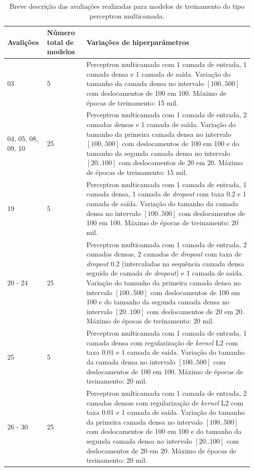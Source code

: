 \begin{table}[ht!]
  \begin{center}
  \setlength{\belowcaptionskip}{10pt}
  \footnotesize {
    \begin{tabular}{|p{1.5cm}|p{2cm}|p{12cm}|}
	  \hline
	  \textbf{Avalições} & \textbf{Número total de modelos} & \textbf{Variações de hiperparâmetros} \\
	  \hline
    03 & 5 & Perceptron multicamada com 1 camada de entrada, 1 camada densa e 1 camada de saída. Variação do tamanho da camada densa no intervalo $[100 .. 500]$ com deslocamentos de 100 em 100. Máximo de épocas de treinamento: 15 mil.\\
    \hline
    04, 05, 08, 09, 10 & 25 & Perceptron multicamada com 1 camada de entrada, 2 camadas densas e 1 camada de saída. Variação do tamanho da primeira camada densa no intervalo $[100 .. 500]$ com deslocamentos de 100 em 100 e do tamanho da segunda camada densa no intervalo $[20 .. 100]$ com deslocamentos de 20 em 20. Máximo de épocas de treinamento: 15 mil. \\
    \hline
    19 & 5 & Perceptron multicamada com 1 camada de entrada, 1 camada densa, 1 camada de \textit{dropout} com taxa 0.2 e 1 camada de saída. Variação do tamanho da camada densa no intervalo $[100 .. 500]$ com deslocamentos de 100 em 100. Máximo de épocas de treinamento: 20 mil. \\
    \hline
    20 - 24 & 25 & Perceptron multicamada com 1 camada de entrada, 2 camadas densas, 2 camadas de \textit{dropout} com taxa de \textit{dropout} 0.2 (intercaladas na sequência camada densa seguida de camada de \textit{dropout}) e 1 camada de saída. Variação do tamanho da primeira camada densa no intervalo $[100 .. 500]$ com deslocamentos de 100 em 100 e do tamanho da segunda camada densa no intervalo $[20 .. 100]$ com deslocamentos de 20 em 20. Máximo de épocas de treinamento: 20 mil. \\
    \hline
    25 & 5 & Perceptron multicamada com 1 camada de entrada, 1 camada densa com regularização de \textit{kernel} L2 com taxa 0.01 e 1 camada de saída. Variação do tamanho da camada densa no intervalo $[100 .. 500]$ com deslocamentos de 100 em 100. Máximo de épocas de treinamento: 20 mil. \\
    \hline
    26 - 30 & 25 & Perceptron multicamada com 1 camada de entrada, 2 camadas densas com regularização de \textit{kernel} L2 com taxa 0.01 e 1 camada de saída. Variação do tamanho da primeira camada densa no intervalo $[100 .. 500]$ com deslocamentos de 100 em 100 e do tamanho da segunda camada densa no intervalo $[20 .. 100]$ com deslocamentos de 20 em 20. Máximo de épocas de treinamento: 20 mil. \\
    \hline
    \end{tabular}
  }
  \caption{Breve descrição das avaliações realizadas para modelos de treinamento do tipo perceptron multicamada.}
  \label{table:descricao_avaliacoes_perceptron_multicamada}
  \end{center}
\end{table}


